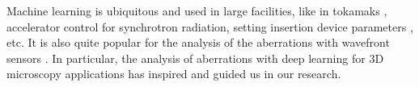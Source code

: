 \documentclass[preprint]{iucr}
\newcommand{\todo}[1]{{\color{red}[TODO: "#1'']}}
\begin{document}
Machine learning is ubiquitous and used in large facilities, like in tokamaks \cite{Degrave2022-ip}, accelerator control \cite{ML_acc_edelen2020} for synchrotron radiation,  setting insertion device parameters \cite{Sheppard:yi5121}, etc. It is also quite popular for the analysis of the aberrations with wavefront sensors \cite{Nishizaki:19, Mockl2019-sr, Vanberg2019}. 
In particular, the analysis of aberrations with deep learning for 3D microscopy applications \cite{Saha2020} has inspired and guided us in our research.     






\end{document}
